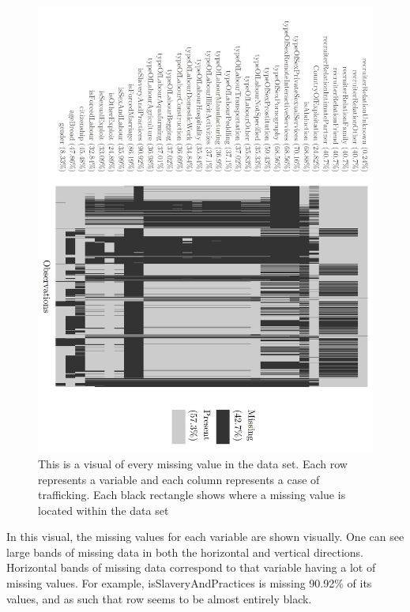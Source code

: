 \documentclass{article} %
\begin{document}
	\FloatBarrier
	\begin{figure}[H]
		\hspace*{-2cm}
		\includegraphics[height = 1.4\textwidth, angle = 90]{NaniarVis1}
		\caption[]{This is a visual of every missing value in the data set. Each row represents a variable and each column represents a case of trafficking. Each black rectangle shows where a missing value is located within the data set}
		\label{fig:Naniar}
	\end{figure}
	\FloatBarrier
In this visual, the missing values for each variable are shown visually. One can see large bands of missing data in both the horizontal and vertical directions. Horizontal bands of missing data correspond to that variable having a lot of missing values. For example, isSlaveryAndPractices is missing 90.92\% of its values, and as such that row seems to be almost entirely black. 
\end{document}
